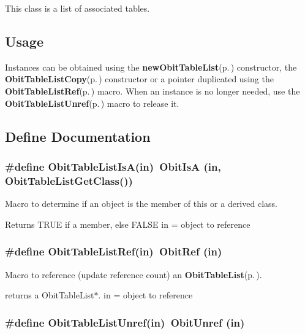 This class is a list of associated tables.\subsection{Usage}\label{ObitTableList_8h_ObitTableListUsage}
Instances can be obtained using the {\bf new\-Obit\-Table\-List}{\rm (p.\,\pageref{ObitTableList_8c_a10})} constructor, the {\bf Obit\-Table\-List\-Copy}{\rm (p.\,\pageref{ObitTableList_8c_a12})} constructor or a pointer duplicated using the {\bf Obit\-Table\-List\-Ref}{\rm (p.\,\pageref{ObitTableList_8h_a1})} macro. When an instance is no longer needed, use the {\bf Obit\-Table\-List\-Unref}{\rm (p.\,\pageref{ObitTableList_8h_a0})} macro to release it.

\subsection{Define Documentation}
\subsubsection{\setlength{\rightskip}{0pt plus 5cm}\#define Obit\-Table\-List\-Is\-A(in)\ Obit\-Is\-A (in, Obit\-Table\-List\-Get\-Class())}\label{ObitTableList_8h_a2}


Macro to determine if an object is the member of this or a derived class. 

Returns TRUE if a member, else FALSE in = object to reference 
\subsubsection{\setlength{\rightskip}{0pt plus 5cm}\#define Obit\-Table\-List\-Ref(in)\ Obit\-Ref (in)}\label{ObitTableList_8h_a1}


Macro to reference (update reference count) an {\bf Obit\-Table\-List}{\rm (p.\,\pageref{structObitTableList})}. 

returns a Obit\-Table\-List$\ast$. in = object to reference 
\subsubsection{\setlength{\rightskip}{0pt plus 5cm}\#define Obit\-Table\-List\-Unref(in)\ Obit\-Unref (in)}\label{ObitTableList_8h_a0}


